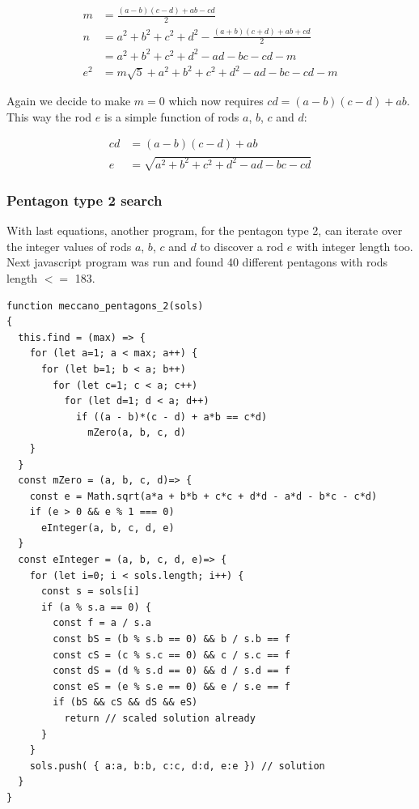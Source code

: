\documentclass[11pt]{article}
\begin{document}
\begin{align*}
m   &= \frac{(a - b)(c - d) + ab - cd}{2} \\
n   &= a^2 + b^2 + c^2 + d^2 - \frac{(a + b)(c + d) + ab + cd}{2} \\
    &=  a^2 + b^2 + c^2 + d^2 - ad - bc - cd - m \\
e^2 &= m\sqrt{5} + a^2 + b^2 + c^2 + d^2 - ad - bc - cd - m
\end{align*}

Again we decide to make $m = 0$ which now requires $cd = (a-b)(c-d)+ab$.
This way the rod $e$ is a simple function of rods $a$, $b$, $c$ and $d$:

\begin{align*}
cd &= (a - b)(c - d ) + ab \\
e &= \sqrt{a^2 + b^2 + c^2 + d^2 - ad - bc - cd}
\end{align*}

\subsubsection{Pentagon type 2 search}

With last equations, another program, for the pentagon type 2, can iterate over the integer values of rods $a$, $b$, $c$ and $d$ to discover a rod $e$ with integer length too. Next javascript program was run and found 40 different pentagons with rods length $<=$ 183.

\begin{lstlisting}
function meccano_pentagons_2(sols)
{
  this.find = (max) => {
    for (let a=1; a < max; a++) {
      for (let b=1; b < a; b++)
        for (let c=1; c < a; c++)
          for (let d=1; d < a; d++)
            if ((a - b)*(c - d) + a*b == c*d)
              mZero(a, b, c, d)
    }
  }
  const mZero = (a, b, c, d)=> {
    const e = Math.sqrt(a*a + b*b + c*c + d*d - a*d - b*c - c*d)
    if (e > 0 && e % 1 === 0)
      eInteger(a, b, c, d, e)
  }
  const eInteger = (a, b, c, d, e)=> {
    for (let i=0; i < sols.length; i++) {
      const s = sols[i]
      if (a % s.a == 0) {
        const f = a / s.a
        const bS = (b % s.b == 0) && b / s.b == f
        const cS = (c % s.c == 0) && c / s.c == f
        const dS = (d % s.d == 0) && d / s.d == f
        const eS = (e % s.e == 0) && e / s.e == f
        if (bS && cS && dS && eS)
          return // scaled solution already
      }
    }
    sols.push( { a:a, b:b, c:c, d:d, e:e }) // solution
  }
}

\end{lstlisting}
\end{document}
